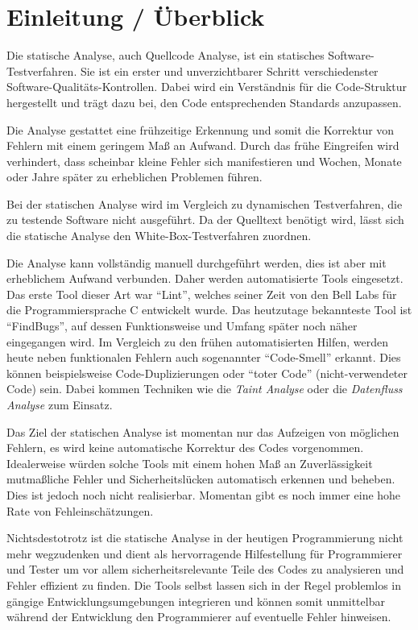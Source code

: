 \section{Einleitung / \"Uberblick}
Die statische Analyse, auch Quellcode Analyse, ist ein statisches Software-Testverfahren. Sie ist ein erster und unverzichtbarer Schritt verschiedenster Software-Qualitäts-Kontrollen. Dabei wird ein Verständnis für die Code-Struktur hergestellt und trägt dazu bei, den Code entsprechenden Standards anzupassen.

Die Analyse gestattet eine frühzeitige Erkennung und somit die Korrektur von Fehlern mit einem geringem Maß an Aufwand. Durch das frühe Eingreifen wird verhindert, dass scheinbar kleine Fehler sich manifestieren und Wochen, Monate oder Jahre später zu erheblichen Problemen führen.

Bei der statischen Analyse wird im Vergleich zu dynamischen Testverfahren, die zu testende Software nicht ausgeführt. Da der Quelltext benötigt wird, lässt sich die statische Analyse den White-Box-Testverfahren zuordnen.

Die Analyse kann vollständig manuell durchgeführt werden, dies ist aber mit erheblichem Aufwand verbunden. Daher werden automatisierte Tools eingesetzt. Das erste Tool dieser Art war ``Lint'', welches seiner Zeit von den Bell Labs für die Programmiersprache C entwickelt wurde. Das heutzutage bekannteste Tool ist ``FindBugs'', auf dessen Funktionsweise und Umfang später noch näher eingegangen wird. Im Vergleich zu den frühen automatisierten Hilfen, werden heute neben funktionalen Fehlern auch sogenannter ``Code-Smell'' erkannt. Dies können beispielsweise Code-Duplizierungen oder ``toter Code'' (nicht-verwendeter Code) sein. Dabei kommen Techniken wie die \emph{Taint Analyse} oder die \emph{Datenfluss Analyse} zum Einsatz.

Das Ziel der statischen Analyse ist momentan nur das Aufzeigen von möglichen Fehlern, es wird keine automatische Korrektur des Codes vorgenommen. Idealerweise würden solche Tools mit einem hohen Maß an Zuverlässigkeit mutmaßliche Fehler und Sicherheitslücken automatisch erkennen und beheben. Dies ist jedoch noch nicht realisierbar. Momentan gibt es noch immer eine hohe Rate von Fehleinschätzungen.

Nichtsdestotrotz ist die statische Analyse in der heutigen Programmierung nicht mehr wegzudenken und dient als hervorragende Hilfestellung für Programmierer und Tester um vor allem sicherheitsrelevante Teile des Codes zu analysieren und Fehler effizient zu finden.
Die Tools selbst lassen sich in der Regel problemlos in gängige Entwicklungsumgebungen integrieren und können somit unmittelbar während der Entwicklung den Programmierer auf eventuelle Fehler hinweisen.

